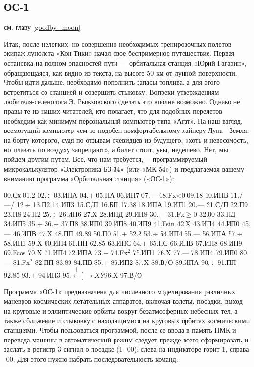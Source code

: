 \documentclass[11pt,a4paper,oneside]{article}
\def\XY{$\stackrel[\leftarrow]{\rightarrow}{XY}$}
\begin{document}
\subsection{ОС-1}
см. главу \ref{goodby_moon}

Итак, после нелегких, но совершенно необходимых тренировочных полетов экипаж лунолета «Кон-Тики» начал свое беспримерное путешествие. Первая остановка на полном опасностей пути — орбитальная станция «Юрий Гагарин», обращающаяся, как видно из текста, на высоте 50 км от лунной поверхности. Чтобы идти дальше, необходимо пополнить запасы топлива, а для этого встретиться со станцией и совершить стыковку. Вопреки утверждениям любителя-селенолога Э. Рыжковского сделать это вполне возможно. Однако не правы те из наших читателей, кто полагает, что для подобных перелетов необходим как минимум персональный компьютер типа «Агат». На наш взгляд, всемогущий компьютер чем-то подобен комфортабельному лайнеру Луна—Земля, на борту которого, судя по отзывам очевидцев из будущего, «хоть и невесомость, но плавать по воздуху запрещают», а билет стоит, увы, недешево. Нет, мы пойдем другим путем. Все, что нам требуется,— программируемый микрокалькулятор «Электроника БЗ-34» (или «МК-54») и предлагаемая вашему вниманию программа «Орбитальная станция» («ОС-1»):

00.Сх 01.2 02.$\div$ 03.ИПА 04.+ 05.ПА 06.ИП7 07.— 08.Fx<0 09.18 10.ИПВ 11./—/ 12.$\div$ 13.П2 14.ИП3 15.С/П
16.БП 17.38 18.ИПА 19.ИП1 20.—
21.С/П 22.П9 23.П8 24.П2 25.$\div$ 26.ИП6
27.X 28.ИПД 29.ИП8 30.— 31.Fx$\geq$0 32.00 33.ПД 34.ИП5 35.+ 36.$\div$ 37.П8
38.ИП0 39.ИП8 40.ИП9 41.Fsin
42.X 43.ИП4 44.ИП0 45.— 46.ИПВ 47.X
48.ПП 49.89 50.П0 51.+ 52.2 53.$\div$ 54.ИП4 55.— 56.ИПА 57.$\div$ 58.ИП1 59.X
60.ИП4 61.ПП 62.85 63.ИПС 64.+
65.ПС 66.ИПВ 67.ИП8 68.ИП9 69.Fcos
70.X 71.ИП4 72.ИПА 73.$\div$ 74.Fx$^{2}$
75.ИП1 76.X 77.— 78.ИП4 79.ИП0 80.— 81.Fx$^{2}$ 82.ПП 83.89 84.ПВ 85.+ 86.ИП2 87.X 88.В/О 89.ИПА 90.$\div$ 91.ПП 92.85
93.+ 94.ИП3 95.\XY 96.X 97.В/О

Программа «ОС-1» предназначена для численного моделирования различных маневров космических летательных аппаратов, включая взлеты, посадки, выход на круговые и эллиптические орбиты вокруг безатмосферных небесных тел, а также сближение и стыковку с находящимися на круговых орбитах космическими станциями. Чтобы пользоваться программой, после ее ввода в память ПМК и перевода машины в автоматический режим следует прежде всего сформировать и заслать в регистр 3 сигнал о посадке (1 -00); слева на индикаторе горит 1, справа -00. Для этого нужно набрать последовательность команд:
\end{document}
